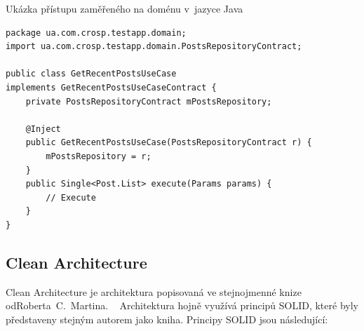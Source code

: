 \begin{listing}
    \caption{Ukázka přístupu zaměřeného na doménu v~jazyce Java~\cite{architecture}}
    \label{code:architecture-domain}
    \begin{verbatim}
package ua.com.crosp.testapp.domain;
import ua.com.crosp.testapp.domain.PostsRepositoryContract;

public class GetRecentPostsUseCase
implements GetRecentPostsUseCaseContract {
    private PostsRepositoryContract mPostsRepository;

    @Inject
    public GetRecentPostsUseCase(PostsRepositoryContract r) {
        mPostsRepository = r;
    }
    public Single<Post.List> execute(Params params) {
        // Execute
    }
}
    \end{verbatim}
\end{listing}

\subsection{Clean Architecture}

Clean Architecture je architektura popisovaná ve stejnojmenné knize
od\linebreak \mbox{Roberta~C. Martina}.
\emph{}~\cite[str.~57]{martin_clean_architecture}
\linebreak
Architektura hojně využívá principů SOLID,
které byly představeny stejným autorem jako kniha.
Principy SOLID jsou následující:

